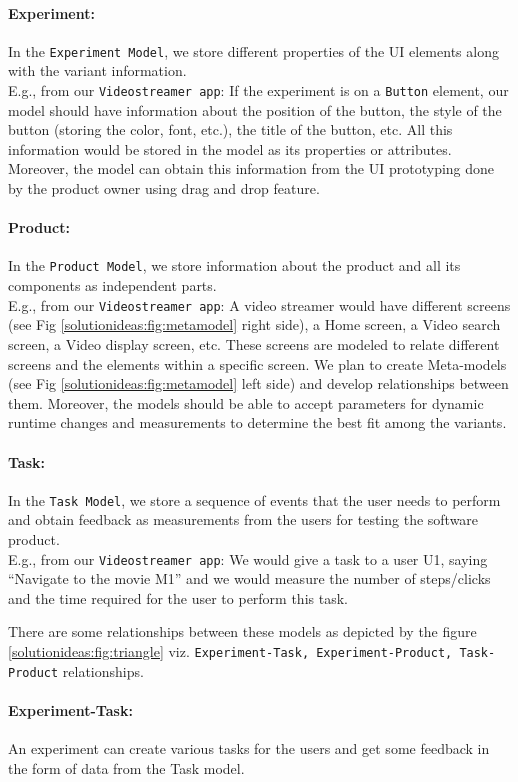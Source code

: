 \paragraph{Experiment:} In the \texttt{Experiment Model}, we store different properties of the UI elements along with the variant information.\\
E.g., from our \texttt{Videostreamer app}: If the experiment is on a \texttt{Button} element, our model should have information about the position of the button, the style of the button (storing the color, font, etc.), the title of the button, etc. All this information would be stored in the model as its properties or attributes.
Moreover, the model can obtain this information from the UI prototyping done by the product owner using drag and drop feature.
\paragraph{Product:} In the \texttt{Product Model}, we store information about the product and all its components as independent parts.\\
E.g., from our \texttt{Videostreamer app}: A video streamer would have different screens (see Fig \ref{solutionideas:fig:metamodel} right side), a Home screen, a Video search screen, a Video display screen, etc. 
These screens are modeled to relate different screens and the elements within a specific screen. 
We plan to create Meta-models  (see Fig \ref{solutionideas:fig:metamodel} left side) and develop relationships between them. 
Moreover, the models should be able to accept parameters for dynamic runtime changes and measurements to determine the best fit among the variants.
\paragraph{Task:} In the \texttt{Task Model}, we store a sequence of events that the user needs to perform and obtain feedback as measurements from the users for testing the software product.\\
E.g., from our \texttt{Videostreamer app}: We would give a task to a user U1, saying ``Navigate to the movie M1'' and we would measure the number of steps/clicks and the time required for the user to perform this task.

There are some relationships between these models as depicted by the figure \ref{solutionideas:fig:triangle} viz. \texttt{Experiment-Task, Experiment-Product, Task-Product} relationships.
\paragraph{Experiment-Task:} An experiment can create various tasks for the users and get some feedback in the form of data from the Task model. 
